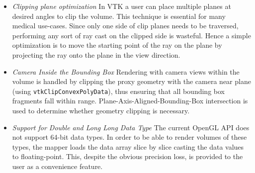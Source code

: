 \begin{itemize}
  \item \emph{Clipping plane optimization} In VTK a user can place multiple planes at
    desired angles to clip the volume. This technique is essential for many
    medical use-cases. Since only one side of clip planes needs to be traversed,
    performing any sort of ray cast on the clipped side is wasteful. Hence a
    simple optimization is to move the starting point of the ray on the plane by
    projecting the ray onto the plane in the view direction.
  \item \emph{Camera Inside the Bounding Box} Rendering with camera views within
    the volume is handled by clipping the proxy geometry with the camera near plane
    (using \texttt{vtkClipConvexPolyData}), thus ensuring that all
    bounding box fragments fall within range.
    Plane-Axis-Aligned-Bounding-Box intersection is used to determine whether
    geometry clipping is necessary.
  \item \emph{Support for Double and Long Long Data Type} The current OpenGL API does not
    support 64-bit data types. In order to be able to render volumes of these
    types, the mapper loads the data array slice by slice casting the data
    values to floating-point. This, despite the obvious precision loss, is
    provided to the user as a convenience feature.
\end{itemize}